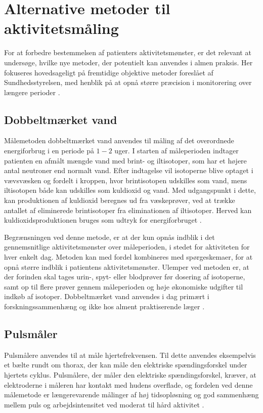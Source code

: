 \section{Alternative metoder til aktivitetsmåling} \label{sec:alternativemetoder}

For at forbedre bestemmelsen af patienters aktivitetsmønster, er det relevant at undersøge, hvilke nye metoder, der potentielt kan anvendes i almen praksis. Her fokuseres hovedsageligt på fremtidige objektive metoder foreslået af Sundhedsstyrelsen, med henblik på at opnå større præcision i monitorering over længere perioder \citep{motionsraad2007}.

\subsection{Dobbeltmærket vand}

Målemetoden dobbeltmærket vand anvendes til måling af det overordnede energiforbrug i en periode på $1-2$ uger. I starten af måleperioden indtager patienten en afmålt mængde vand med brint- og iltisotoper, som har et højere antal neutroner end normalt vand. Efter indtagelse vil isotoperne blive optaget i vævsvæsken og fordelt i kroppen, hvor brintisotopen udskilles som vand, mens iltisotopen både kan udskilles som kuldioxid og vand. Med udgangspunkt i dette, kan produktionen af kuldioxid beregnes ud fra væskeprøver, ved at trække antallet af eliminerede brintisotoper fra eliminationen af iltisotoper. Herved kan kuldioxidsproduktionen bruges som udtryk for energiforbruget \citep{motionsraad2007,pedersen2011}.

Begrænsningen ved denne metode, er at der kun opnås indblik i det gennemsnitlige aktivitetsmønster over måleperioden, i stedet for aktiviteten for hver enkelt dag. Metoden kan med fordel kombineres med spørgeskemaer, for at opnå større indblik i patientens aktivitetsmønster. 
Ulemper ved metoden er, at der forinden skal tages urin-, spyt- eller blodprøver før dosering af isotoperne, samt op til flere prøver gennem måleperioden og høje økonomiske udgifter til indkøb af isotoper. Dobbeltmærket vand anvendes i dag primært i forskningssammenhæng og ikke hos alment praktiserende læger \citep{motionsraad2007}.

\subsection{Pulsmåler}

Pulsmålere anvendes til at måle hjertefrekvensen. Til dette anvendes eksempelvis et bælte rundt om thorax, der kan måle den elektriske spændingsforskel under hjertets cyklus. Pulsmålere, der måler den elektriske spændingsforskel, kræver, at elektroderne i måleren har kontakt med hudens overflade, og fordelen ved denne målemetode er længerevarende målinger af høj tidsopløsning og god sammenhæng mellem puls og arbejdsintensitet ved moderat til hård aktivitet \citep{motionsraad2007}. 


